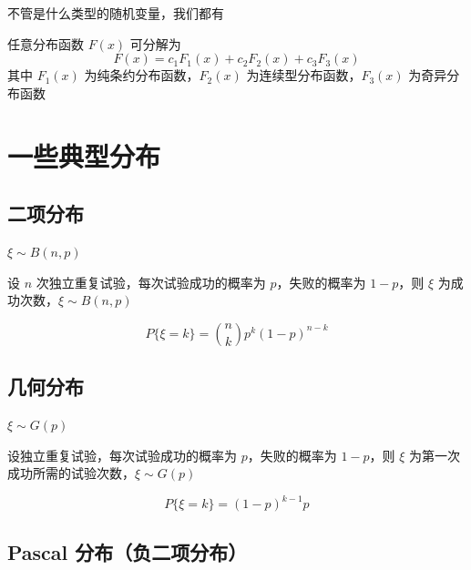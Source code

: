 \documentclass[12pt,a4paper]{amsart}
\begin{document}
不管是什么类型的随机变量，我们都有

\begin{proposition}[Lebesgue 分解]
    任意分布函数 $F(x)$ 可分解为
    \begin{equation}
        F(x) = c_1F_1(x) + c_2F_2(x) + c_3F_3(x)
    \end{equation}
    其中 $F_1(x)$ 为纯条约分布函数，$F_2(x)$ 为连续型分布函数，$F_3(x)$ 为奇异分布函数
\end{proposition}

\section{一些典型分布}

\subsection{二项分布}

$\xi\sim B(n,p)$

\begin{definition}[二项分布]
    设 $n$ 次独立重复试验，每次试验成功的概率为 $p$，失败的概率为 $1-p$，则 $\xi$ 为成功次数，$\xi\sim B(n,p)$
\end{definition}

\begin{proposition}[二项分布的分布函数]
    \begin{equation}
        P\{\xi=k\} = \binom{n}{k}p^k(1-p)^{n-k}
    \end{equation}
\end{proposition}

\subsection{几何分布}

$\xi\sim G(p)$

\begin{definition}[几何分布]
    设独立重复试验，每次试验成功的概率为 $p$，失败的概率为 $1-p$，则 $\xi$ 为第一次成功所需的试验次数，$\xi\sim G(p)$
\end{definition}

\begin{proposition}[几何分布的分布函数]
    \begin{equation}
        P\{\xi=k\} = (1-p)^{k-1}p
    \end{equation}
\end{proposition}

\subsection{Pascal 分布（负二项分布）}
\end{document}
